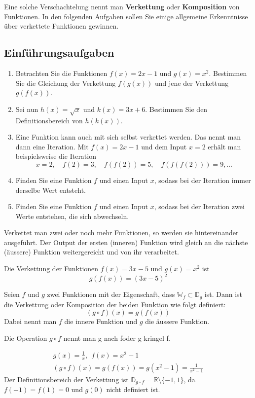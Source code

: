 Eine solche Verschachtelung nennt man \textbf{Verkettung} oder \textbf{Komposition} von Funktionen. In den folgenden Aufgaben sollen Sie einige allgemeine Erkenntnisse über verkettete Funktionen gewinnen.

\subsection{Einführungsaufgaben}
\begin{enumerate}
    \item Betrachten Sie die Funktionen $f(x)=2x-1$ und $g(x)=x^2$. Bestimmen Sie die Gleichung der Verkettung $f(g(x))$ und jene der Verkettung $g(f(x))$.
    \item Sei nun $h(x)=\sqrt{x}$ und $k(x)=3x+6$. Bestimmen Sie den Definitionsbereich von $h(k(x))$.
    \item Eine Funktion kann auch mit sich selbst verkettet werden. Das nennt man dann eine Iteration. Mit $f(x)=2x-1$ und dem Input $x=2$ erhält man beispielsweise die Iteration
          \[x=2,\quad f(2)=3,\quad f\left(f(2)\right)=5,\quad f\left(f\left(f(2)\right)\right)=9,\dots \]
    \item Finden Sie eine Funktion $f$ und einen Input $x$, sodass bei der Iteration immer derselbe Wert entsteht.
    \item 	Finden Sie eine Funktion $f$ und einen Input $x$, sodass bei der Iteration zwei Werte entstehen, die sich abwechseln.
\end{enumerate}
\newpage
Verkettet man zwei oder noch mehr Funktionen, so werden sie hintereinander ausgeführt. Der Output der ersten (inneren) Funktion wird gleich an die nächste (äussere) Funktion weitergereicht und von ihr verarbeitet.

\begin{example}
    Die Verkettung der Funktionen $f(x)=3x-5$ und $g(x)=x^2$ ist
    \[g(f(x))=(3x-5)^2\]
\end{example}
\begin{deff}[Verkettung]{}
    Seien $f$ und $g$ zwei Funktionen mit der Eigenschaft, dass $\mathbb{W}_f\subset \mathbb{D}_g$ ist. Dann ist die Verkettung oder Komposition der beiden Funktion wie folgt definiert:
    \[(g\circ f)(x)=g(f(x))\]
    Dabei nennt man $f$ die innere Funktion und $g$ die äussere Funktion.

    Die Operation $g\circ f$ nennt man \glqq g nach f\grqq oder \glqq g kringel f\grqq{}.
\end{deff}
\begin{example}
    \begin{align*}
        g(x)=\frac{1}{x},\ \ f(x)=x^2-1 \\
        (g\circ f)(x)=g(f(x))=g(x^2-1)=\frac{1}{x^2-1}
    \end{align*}
    Der Definitionsbereich der Verkettung ist $\mathbb{D}_{g\circ f}=\mathbb{R}\setminus\{-1,1\}$, da $f(-1)=f(1)=0$ und $g(0)$ nicht definiert ist.
\end{example}

